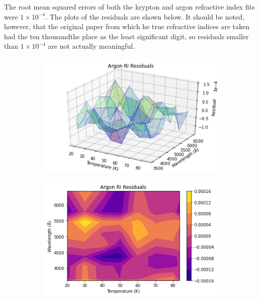\documentclass[letterpaper,12pt]{article}
\newcommand{\sci}[2]{\ensuremath{#1\!\times\!10^{#2}}}
\begin{document}
The root mean squared errors of both the krypton and argon refractive index fits were \sci{1}{-4}. The plots of the residuals are shown below. It should be noted, however, that the original paper from which he true refractive indices are taken had the ten thousandths place as the least significant digit, so residuals smaller than \sci{1}{-4} are not actually meaningful.

\begin{figure}[h!]
	\begin{subfigure}[b]{0.5\linewidth}
		\centering
		\includegraphics[width=\textwidth,height=\textheight,keepaspectratio]{argonres1.png}
	\end{subfigure}
	\begin{subfigure}[b]{0.5\linewidth}
		\centering
		\includegraphics[width=\textwidth,height=\textheight,keepaspectratio]{argonres2.png}
	\end{subfigure}

\end{figure}
\end{document}
